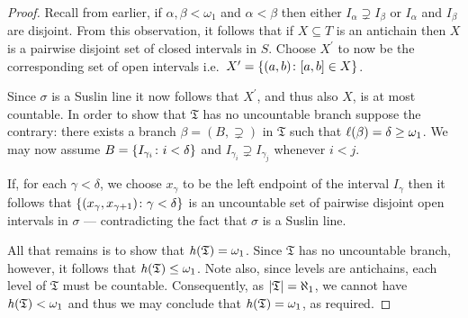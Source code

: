 \begin{proof}
    Recall from earlier, if $\alpha,\beta<\omega_1$ and $\alpha<\beta$ then
    either $I_\alpha\supsetneq I_\beta$ or $I_\alpha$ and $ I_\beta$ are
    disjoint.  From this observation, it follows that if $X\subseteq T$ is an
    antichain then $X$ is a pairwise disjoint set of closed intervals in $S$.
    Choose $X^\prime$ to now be the corresponding set of open intervals i.e.\
    $X^\prime=\left\lbrace (a,b)\colon [a,b]\in X \right\rbrace$.

    Since $\sigma$ is a Suslin line it now follows that $X^\prime$, and thus
    also $X$, is at most countable.  In order to show that $\mathfrak{T}$ has no
    uncountable branch suppose the contrary: there exists a branch
    $\beta=(B,\supsetneq)$ in $\mathfrak{T}$ such that
    $\ell(\beta)=\delta\geq\omega_1$.  We may now assume
    $B=\left\lbrace I_{\gamma_{i}}\colon i<\delta \right\rbrace$ and $I_{\gamma_i}\supsetneq
    I_{\gamma_j}$ whenever $i<j$.

    If, for each $\gamma<\delta$, we choose $x_\gamma$ to be the left endpoint
    of the interval $I_\gamma$ then it follows that
    $\left\lbrace (x_\gamma,x_{\gamma+1})\colon \gamma<\delta \right\rbrace$ is an uncountable set of
    pairwise disjoint open intervals in $\sigma$ --- contradicting the fact that
    $\sigma$ is a Suslin line.

    All that remains is to show that $\mathit{h}(\mathfrak{T})=\omega_1$.  Since
    $\mathfrak{T}$ has no uncountable branch, however, it follows that
    $\mathit{h}(\mathfrak{T})\leq\omega_1$.  Note also, since levels are
    antichains, each level of $\mathfrak{T}$ must be countable.  Consequently,
    as $\left\lvert\mathfrak{T}\right\rvert=\aleph_1$, we cannot have
    $\mathit{h}(\mathfrak{T})<\omega_1$ and thus we may conclude that
    $\mathit{h}(\mathfrak{T})=\omega_1$, as required.
\end{proof}

